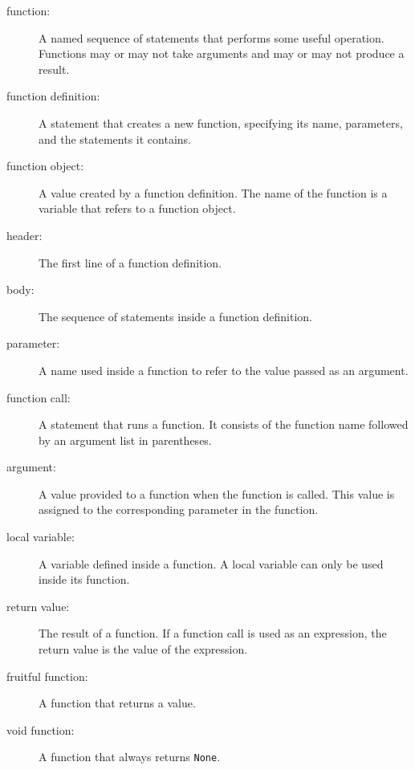 \begin{description}

\item[function:] A named sequence of statements that performs some
useful operation.  Functions may or may not take arguments and may or
may not produce a result.

\item[function definition:]  A statement that creates a new function,
specifying its name, parameters, and the statements it contains.

\item[function object:]  A value created by a function definition.
The name of the function is a variable that refers to a function
object.

\item[header:] The first line of a function definition.

\item[body:] The sequence of statements inside a function definition.

\item[parameter:] A name used inside a function to refer to the value
passed as an argument.

\item[function call:] A statement that runs a function. It
consists of the function name followed by an argument list in
parentheses.

\item[argument:]  A value provided to a function when the function is called.
This value is assigned to the corresponding parameter in the function.

\item[local variable:]  A variable defined inside a function.  A local
variable can only be used inside its function.

\item[return value:]  The result of a function.  If a function call
is used as an expression, the return value is the value of
the expression.

\item[fruitful function:] A function that returns a value.

\item[void function:] A function that always returns {\tt None}.


\end{description}
